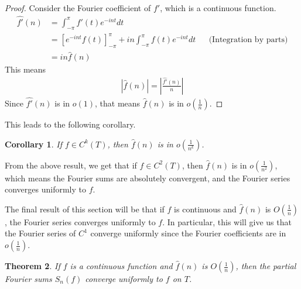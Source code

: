 \documentclass[12pt, titlepage]{article}
\newtheorem{thm}{Theorem}[section]
\newtheorem{cor}[thm]{Corollary}
\theoremstyle{definition}
\begin{document}
\begin{proof}
    Consider the Fourier coefficient of $f'$, which is a continuous function.
    \begin{align*}
        \widehat{f'}(n) &= \int_{-\pi}^{\pi} f'(t) e^{-int} dt \\
        &= \left[e^{-int} f(t) \right]_{-\pi}^{\pi} + in \int_{-\pi}^{\pi} f(t) e^{-int} dt &&\text{(Integration by parts)} \\
        &= in\widehat{f}(n)
    \end{align*}
    This means 
    \begin{align*}
        \left| \widehat{f}(n) \right| = \left| \frac{\widehat{f'}(n)}{n} \right|
    \end{align*}
    Since $\widehat{f'}(n)$ is in $o(1)$, that means $\widehat{f}(n)$ is in $o\left( \frac{1}{n} \right)$.
\end{proof}
This leads to the following corollary.

\begin{cor}
    If $f \in C^k(T)$, then $\widehat{f}(n)$ is in $o \left( \frac{1}{n^k} \right)$.
\end{cor}

From the above result, we get that if $f \in C^2(T)$, then $\widehat{f}(n)$ is in $o\left( \frac{1}{n^2} \right)$, which means the Fourier sums are absolutely convergent, and the Fourier series converges uniformly to $f$.
%
%

The final result of this section will be that if $f$ is continuous and $\widehat{f}(n)$ is $O\left( \frac{1}{n} \right)$, the Fourier series converges uniformly to $f$. In particular, this will give us that the Fourier series of $C^1$ converge uniformly since the Fourier coefficients are in $o\left( \frac{1}{n} \right)$.

\begin{thm}
    If $f$ is a continuous function and $\widehat{f}(n)$ is $O\left( \frac{1}{n} \right)$, then the partial Fourier sums $S_n(f)$ converge uniformly to $f$ on $T$. \cite{bhatia}
\end{thm}
\end{document}
